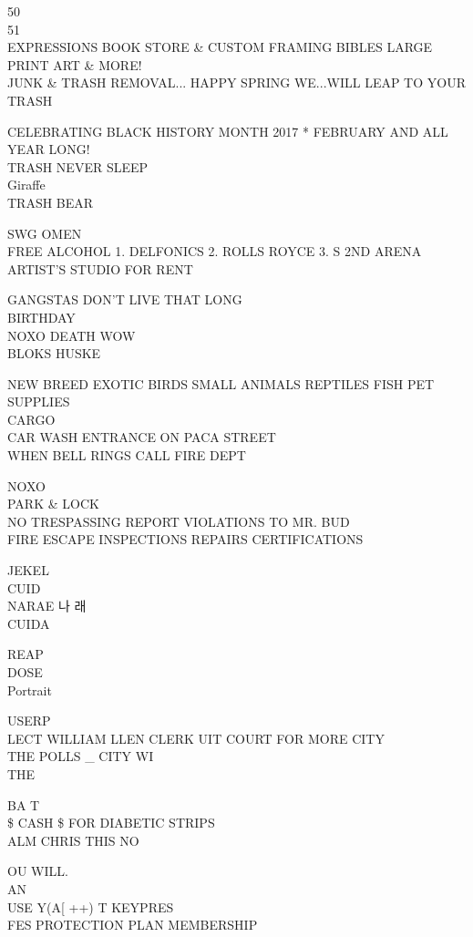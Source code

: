\documentclass[10pt,letterpaper]{article}
\begin{document}
50\\
51\\
EXPRESSIONS BOOK STORE \& CUSTOM FRAMING BIBLES LARGE PRINT ART \& MORE!\\
JUNK \& TRASH REMOVAL... HAPPY SPRING WE...WILL LEAP TO YOUR TRASH

CELEBRATING BLACK HISTORY MONTH 2017 * FEBRUARY AND ALL YEAR LONG!\\
TRASH NEVER SLEEP\\
Giraffe\\
TRASH BEAR

SWG OMEN\\
FREE ALCOHOL 1. DELFONICS 2. ROLLS ROYCE 3. S 2ND ARENA\\
ARTIST'S STUDIO FOR RENT

GANGSTAS DON'T LIVE THAT LONG\\
BIRTHDAY\\
NOXO DEATH WOW\\
BLOKS HUSKE

NEW BREED EXOTIC BIRDS SMALL ANIMALS REPTILES FISH PET SUPPLIES\\
CARGO\\
CAR WASH ENTRANCE ON PACA STREET\\
WHEN BELL RINGS CALL FIRE DEPT

NOXO\\
PARK \& LOCK\\
NO TRESPASSING REPORT VIOLATIONS TO MR. BUD\\
FIRE ESCAPE INSPECTIONS REPAIRS CERTIFICATIONS

JEKEL\\
CUID\\
NARAE 나 래\\
CUIDA

REAP\\
DOSE\\
Portrait

USERP\\
LECT WILLIAM LLEN CLERK UIT COURT FOR MORE CITY\\
THE POLLS \_ CITY WI\\
THE

BA T\\
\$ CASH \$ FOR DIABETIC STRIPS\\
ALM CHRIS THIS NO

OU WILL.\\
AN\\
USE Y(A{[} ++) T KEYPRES\\
FES PROTECTION PLAN MEMBERSHIP
\end{document}

